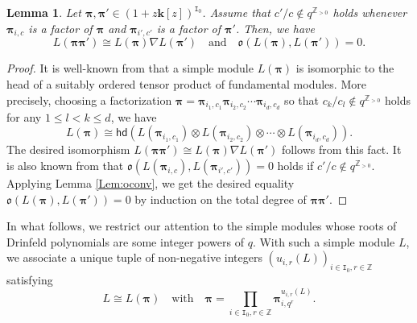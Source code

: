 \documentclass[12pt]{amsart}
\newtheorem{lemma}[theorem]{Lemma}
\theoremstyle{definition}
\theoremstyle{remark}
\numberwithin{equation}{section}
\begin{document}
\begin{lemma} \label{Lem:pi}
Let $ \boldsymbol{\pi},  \boldsymbol{\pi}' \in (1+z\mathbf{k}[z])^{\mathtt{I}_0}$.
Assume that $c'/c \not\in q^{\mathbb Z_{> 0}}$ holds whenever $ \boldsymbol{\pi}_{i,c}$ is a factor of $ \boldsymbol{\pi}$ and $ \boldsymbol{\pi}_{i',c'}$ is a factor of $ \boldsymbol{\pi}'$.
Then, we have  
\[L( \boldsymbol{\pi}  \boldsymbol{\pi}') \cong L( \boldsymbol{\pi}) \nabla L( \boldsymbol{\pi}') \quad \text{and} \quad \mathfrak{o}(L( \boldsymbol{\pi}), L( \boldsymbol{\pi}'))=0. \]
\end{lemma}
\begin{proof}
It is well-known from \cite{chari, kas} that a simple module $L( \boldsymbol{\pi})$ is isomorphic to the head of a suitably ordered tensor product of fundamental modules. 
More precisely, choosing a factorization $ \boldsymbol{\pi} =  \boldsymbol{\pi}_{i_1,c_1} \boldsymbol{\pi}_{i_2,c_2} \cdots  \boldsymbol{\pi}_{i_d,c_d}$ so that $c_k / c_l \not\in q^{\mathbb Z_{> 0}}$ holds for any $1 \le l < k \le d$, we have
\[
L( \boldsymbol{\pi}) \cong \mathsf{hd}\left(L( \boldsymbol{\pi}_{i_1,c_1}) \otimes L( \boldsymbol{\pi}_{i_2,c_2}) \otimes \cdots \otimes L( \boldsymbol{\pi}_{i_d,c_d})\right).
\]
The desired isomorphism $L( \boldsymbol{\pi}  \boldsymbol{\pi}') \cong L( \boldsymbol{\pi}) \nabla L( \boldsymbol{\pi}')$ follows from this fact.
It is also known from \cite{kas} that $\mathfrak{o}(L( \boldsymbol{\pi}_{i,c}), L( \boldsymbol{\pi}_{i',c'})) = 0$ holds if $c'/c \not\in q^{\mathbb Z_{> 0}}$.
Applying Lemma \ref{Lem:oconv}, we get the desired equality $\mathfrak{o}(L( \boldsymbol{\pi}), L( \boldsymbol{\pi}'))=0$ by induction on the total degree of $ \boldsymbol{\pi} \boldsymbol{\pi}'$. 
\end{proof}

In what follows, we restrict our attention to the simple modules whose roots of Drinfeld polynomials are some integer powers of $q$.
With such a simple module $L$, we associate a unique tuple of non-negative integers $(u_{i,r}(L))_{i \in \mathtt{I}_0, r \in \mathbb{Z}}$ satisfying
\begin{equation} \label{eq:notation_u}
L \cong L(\boldsymbol{\pi}) \quad \text{with}\quad \boldsymbol{\pi} = \prod_{i \in \mathtt{I}_0, r \in \mathbb{Z}} \boldsymbol{\pi}_{i,q^r}^{u_{i,r}(L)}.
\end{equation}
\end{document}
